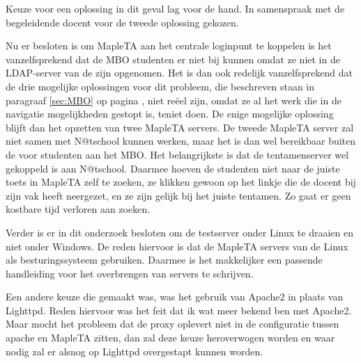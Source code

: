 Keuze voor een oplossing in dit geval lag voor de hand. In samenspraak
met de begeleidende docent voor de tweede oplossing gekozen.


Nu er besloten is om MapleTA aan het centrale loginpunt te koppelen is
het vanzelfsprekend dat de MBO studenten er niet bij kunnen omdat ze
niet in de LDAP-server van de \HR{} zijn opgenomen. Het is dan ook
redelijk vanzelfsprekend dat de drie mogelijke oplossingen voor dit
probleem, die beschreven staan in paragraaf \ref{sec:MBO} op pagina
\pageref{sec:MBO}, niet reëel zijn, omdat ze al het werk die in de
navigatie mogelijkheden gestopt is, teniet doen. De enige mogelijke
oplossing blijft dan het opzetten van twee MapleTA servers. De tweede
MapleTA server zal niet samen met N@tschool kunnen werken, maar het is
dan wel bereikbaar buiten de \HR{} voor studenten aan het MBO. Het
belangrijkste is dat de tentamenserver wel gekoppeld is aan
N@tschool. Daarmee hoeven de studenten niet naar de juiste toets in
MapleTA zelf te zoeken, ze klikken gewoon op het linkje die de docent
bij zijn vak heeft neergezet, en ze zijn gelijk bij het juiste
tentamen. Zo gaat er geen kostbare tijd verloren aan zoeken.


Verder is er in dit onderzoek besloten om de testserver onder Linux te
draaien en niet onder Windows. De reden hiervoor is dat de MapleTA
servers van de \HR{} Linux als besturingssysteem gebruiken. Daarmee is
het makkelijker een passende handleiding voor het overbrengen van
servers te schrijven.

Een andere keuze die gemaakt was, was het gebruik van Apache2 in
plaats van Lighttpd. Reden hiervoor was het feit dat ik wat meer
bekend ben met Apache2. Maar mocht het probleem dat de proxy oplevert
niet in de configuratie tussen apache en MapleTA zitten, dan zal deze
keuze heroverwogen worden en waar nodig zal er alsnog op Lighttpd
overgestapt kunnen worden.

